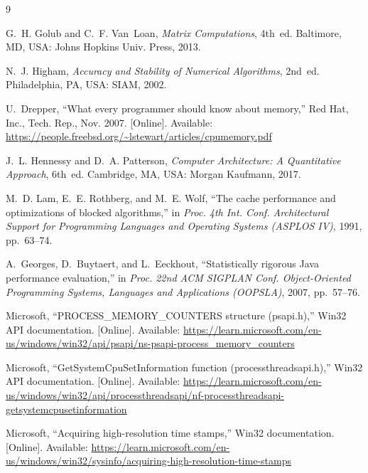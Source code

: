 \documentclass[11pt,a4paper]{article}
\begin{document}
\begin{thebibliography}{9}

G.~H. Golub and C.~F. Van~Loan, \emph{Matrix Computations}, 4th~ed.
Baltimore, MD, USA: Johns Hopkins Univ. Press, 2013.

N.~J. Higham, \emph{Accuracy and Stability of Numerical Algorithms}, 2nd~ed.
Philadelphia, PA, USA: SIAM, 2002.

U.~Drepper, ``What every programmer should know about memory,'' Red Hat, Inc., Tech. Rep., Nov. 2007.
[Online]. Available: \url{https://people.freebsd.org/~lstewart/articles/cpumemory.pdf}

J.~L. Hennessy and D.~A. Patterson, \emph{Computer Architecture: A Quantitative Approach}, 6th~ed.
Cambridge, MA, USA: Morgan Kaufmann, 2017.

M.~D. Lam, E.~E. Rothberg, and M.~E. Wolf, ``The cache performance and optimizations of blocked
algorithms,'' in \emph{Proc. 4th Int. Conf. Architectural Support for Programming Languages and
Operating Systems (ASPLOS IV)}, 1991, pp.~63--74.

A.~Georges, D.~Buytaert, and L.~Eeckhout, ``Statistically rigorous Java performance evaluation,''
in \emph{Proc. 22nd ACM SIGPLAN Conf. Object-Oriented Programming Systems, Languages and Applications
(OOPSLA)}, 2007, pp.~57--76.

Microsoft, ``PROCESS\_MEMORY\_COUNTERS structure (psapi.h),'' Win32 API documentation.
[Online]. Available: \url{https://learn.microsoft.com/en-us/windows/win32/api/psapi/ns-psapi-process_memory_counters}

Microsoft, ``GetSystemCpuSetInformation function (processthreadsapi.h),'' Win32 API documentation.
[Online]. Available: \url{https://learn.microsoft.com/en-us/windows/win32/api/processthreadsapi/nf-processthreadsapi-getsystemcpusetinformation}

Microsoft, ``Acquiring high-resolution time stamps,'' Win32 documentation.
[Online]. Available: \url{https://learn.microsoft.com/en-us/windows/win32/sysinfo/acquiring-high-resolution-time-stamps}

\end{thebibliography}
\end{document}
